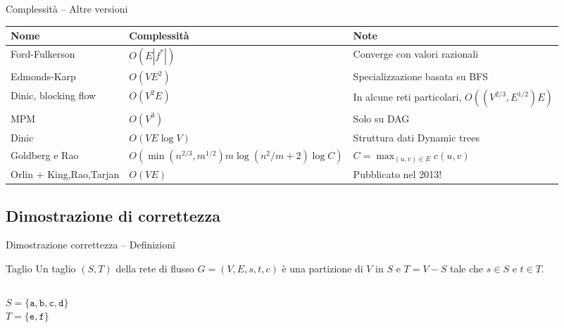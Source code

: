 \begin{frame}{Complessità -- Altre versioni}

\small
\begin{tabular}{|P{2.6cm}|P{4.5cm}|P{3.9cm}|}
\hline
\textbf{Nome} & \textbf{Complessità} & \textbf{Note} \\\hline
Ford-Fulkerson & $O(E|f^*|)$ & Converge con valori razionali \\\hline
Edmonds-Karp & $O(VE^2)$ & Specializzazione basata su BFS \\\hline
Dinic, blocking flow & $O(V^2E)$ & In alcune reti particolari, $O((V^{2/3},E^{1/2})E)$ \\\hline
MPM & $O(V^3)$ & Solo su DAG \\\hline
Dinic & $O(VE \log V)$ & Struttura dati Dynamic trees \\\hline
Goldberg e Rao & \begingroup \footnotesize $O(\min(n^{2/3},m^{1/2})m \log (n^2/m+2) \log C)$ \endgroup & $C=\max_{(u,v) \in E} c(u,v)$ \\\hline
Orlin + King,Rao,Tarjan & $O(VE)$ & Pubblicato nel 2013!\\\hline
\end{tabular}

\end{frame}


\subsection{Dimostrazione di correttezza}

\begin{frame}{Dimostrazione correttezza -- Definizioni}

\vspace{-12pt}
\begin{block}{Taglio}
Un \alert{taglio} $(S,T)$ della rete di flusso 
$G=(V,E,s,t,c)$ è una partizione di $V$ in $S$ e $T=V-S$
tale che $s \in S$ e $t \in T$.
\end{block}

\vspace{-12pt}
\begin{columns}[T]
\vspace{18pt}
$S = \{ \mathtt{a}, \mathtt{b}, \mathtt{c}, \mathtt{d} \}$\\
$T = \{ \mathtt{e}, \mathtt{f} \}$\\
\end{columns}


\end{frame}


